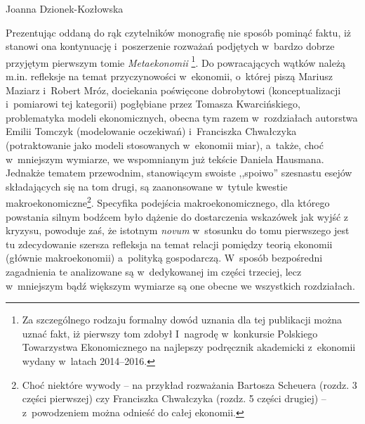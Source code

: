 \begin{recplenv}{Joanna Dzionek-Kozłowska}
\enlargethispage{-.5\baselineskip}

Prezentując oddaną do rąk czytelników monografię nie sposób pominąć faktu, iż stanowi ona kontynuację i~poszerzenie
rozważań podjętych w~bardzo dobrze przyjętym pierwszym tomie \textit{Metaekonomii}
\parencite{gorazda_metaekonomia:_2016}\footnote{Za szczególnego rodzaju formalny dowód uznania dla tej
	publikacji można uznać fakt, iż pierwszy tom zdobył
	I~nagrodę w~konkursie Polskiego Towarzystwa Ekonomicznego
	na najlepszy podręcznik akademicki z~ekonomii wydany w~latach 2014--2016.}.
Do powracających wątków należą m.in. refleksje na temat przyczynowości w~ekonomii, o~której piszą Mariusz
Maziarz i~Robert Mróz, dociekania poświęcone dobrobytowi (konceptualizacji i~pomiarowi tej kategorii)
pogłębiane przez Tomasza
Kwarcińskiego, problematyka modeli ekonomicznych, obecna tym razem w~rozdziałach autorstwa Emilii Tomczyk (modelowanie
oczekiwań) i~Franciszka Chwałczyka (potraktowanie jako modeli stosowanych w~ekonomii miar), a~także, choć w~mniejszym
wymiarze, we wspomnianym już tekście Daniela Hausmana. Jednakże tematem przewodnim, stanowiącym swoiste ,,spoiwo''
szesnastu esejów składających się na tom drugi, są zaanonsowane w~tytule kwestie makroekonomiczne\footnote{Choć niektóre
	wywody -- na przykład rozważania Bartosza Scheuera (rozdz. 3 części pierwszej) czy Franciszka Chwałczyka (rozdz. 5 części
drugiej) -- z~powodzeniem można odnieść do całej ekonomii.}. Specyfika podejścia makroekonomicznego, dla którego
powstania silnym bodźcem było dążenie do dostarczenia wskazówek jak wyjść z kryzysu, powoduje zaś, że istotnym
\textit{novum} w~stosunku do tomu pierwszego jest tu zdecydowanie szersza refleksja na temat relacji pomiędzy teorią
ekonomii (głównie makroekonomii) a~polityką gospodarczą. W~sposób bezpośredni zagadnienia te analizowane
są w~dedykowanej im części trzeciej, lecz w~mniejszym bądź większym wymiarze są one obecne we wszystkich rozdziałach. 


\end{recplenv}
